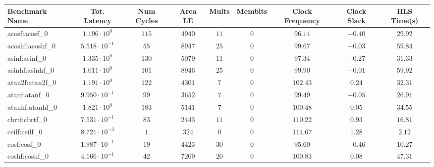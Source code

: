 \begin{tabular}{|l|c|c|c|c|c|c|c|c|}
\hline
Benchmark Name               & Tot. Latency            & Num Cycles & Area LE    & Mults   & Membits & Clock Frequency & Clock Slack & HLS Time(s) \\
\hline
acosf:acosf\_0               & $ 1.196 \cdot 10^{0}  $ & $ 115    $ & $ 4940   $ & $ 11  $ & $ 0   $ & $ 96.14       $ & $ -0.40   $ & $ 29.92   $ \\
acoshf:acoshf\_0             & $ 5.518 \cdot 10^{-1} $ & $ 55     $ & $ 8947   $ & $ 25  $ & $ 0   $ & $ 99.67       $ & $ -0.03   $ & $ 59.84   $ \\
asinf:asinf\_0               & $ 1.335 \cdot 10^{0}  $ & $ 130    $ & $ 5079   $ & $ 11  $ & $ 0   $ & $ 97.34       $ & $ -0.27   $ & $ 31.33   $ \\
asinhf:asinhf\_0             & $ 1.011 \cdot 10^{0}  $ & $ 101    $ & $ 8946   $ & $ 25  $ & $ 0   $ & $ 99.90       $ & $ -0.01   $ & $ 59.92   $ \\
atan2f:atan2f\_0             & $ 1.191 \cdot 10^{0}  $ & $ 122    $ & $ 4301   $ & $ 7   $ & $ 0   $ & $ 102.43      $ & $ 0.24    $ & $ 32.31   $ \\
atanf:atanf\_0               & $ 9.950 \cdot 10^{-1} $ & $ 99     $ & $ 3652   $ & $ 7   $ & $ 0   $ & $ 99.49       $ & $ -0.05   $ & $ 26.91   $ \\
atanhf:atanhf\_0             & $ 1.821 \cdot 10^{0}  $ & $ 183    $ & $ 5141   $ & $ 7   $ & $ 0   $ & $ 100.48      $ & $ 0.05    $ & $ 34.55   $ \\
cbrtf:cbrtf\_0               & $ 7.531 \cdot 10^{-1} $ & $ 83     $ & $ 2443   $ & $ 11  $ & $ 0   $ & $ 110.22      $ & $ 0.93    $ & $ 16.81   $ \\
ceilf:ceilf\_0               & $ 8.721 \cdot 10^{-3} $ & $ 1      $ & $ 324    $ & $ 0   $ & $ 0   $ & $ 114.67      $ & $ 1.28    $ & $ 2.12    $ \\
cosf:cosf\_0                 & $ 1.987 \cdot 10^{-1} $ & $ 19     $ & $ 4423   $ & $ 30  $ & $ 0   $ & $ 95.60       $ & $ -0.46   $ & $ 10.27   $ \\
coshf:coshf\_0               & $ 4.166 \cdot 10^{-1} $ & $ 42     $ & $ 7209   $ & $ 20  $ & $ 0   $ & $ 100.83      $ & $ 0.08    $ & $ 47.31   $ \\

\end{tabular}
